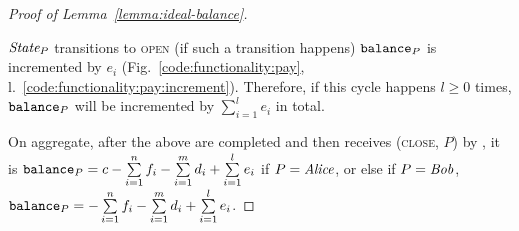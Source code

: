 \begin{proof}[Proof of Lemma~\ref{lemma:ideal-balance}]
\begin{itemize}
    $\itistate_P$ transitions to \textsc{open} (if such a transition happens)
    $\texttt{balance}_{P}$ is incremented by $e_i$
    (Fig.~\ref{code:functionality:pay},
    l.~\ref{code:functionality:pay:increment}). Therefore, if this cycle
    happens $l \geq 0$ times, $\texttt{balance}_{P}$ will be incremented by
    $\sum\limits_{i=1}^l e_i$ in total.
  \end{itemize}
  On aggregate, after the above are completed and then \fchan receives
  (\textsc{close}, $P$) by \simulator, it is $\texttt{balance}_{P} = c -
  \sum\limits_{i=1}^n f_i - \sum\limits_{i=1}^m d_i + \sum\limits_{i=1}^l e_i$
  if $P = \mathit{Alice}$, or else if $P = \mathit{Bob}$, $\texttt{balance}_{P} = - \sum\limits_{i=1}^n
  f_i - \sum\limits_{i=1}^m d_i + \sum\limits_{i=1}^l e_i$.
\end{proof}
